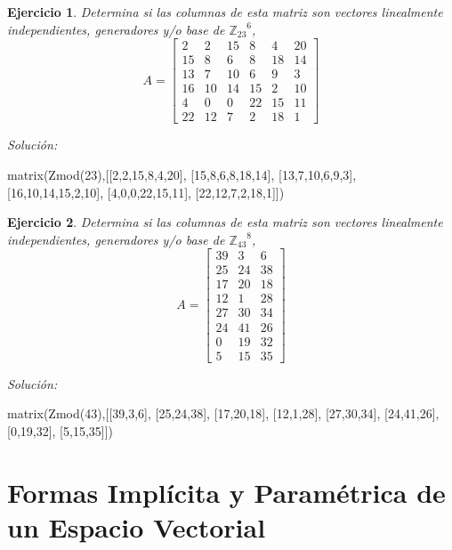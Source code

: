 \documentclass{amsart}
\newtheorem{ejer}{Ejercicio}
\begin{document}


\begin{ejer} Determina si las columnas de esta matriz son vectores linealmente independientes, generadores y/o base de ${{\mathbb Z}_{23}}^{6}$,
\[ A = \left[\begin{array}{rrrrrr}
2 & 2 & 15 & 8 & 4 & 20 \\
15 & 8 & 6 & 8 & 18 & 14 \\
13 & 7 & 10 & 6 & 9 & 3 \\
16 & 10 & 14 & 15 & 2 & 10 \\
4 & 0 & 0 & 22 & 15 & 11 \\
22 & 12 & 7 & 2 & 18 & 1
\end{array}\right] \]
\end{ejer}

{\it Soluci\'on:}

\begin{sageblock}
matrix(Zmod(23),[[2,2,15,8,4,20],
[15,8,6,8,18,14],
[13,7,10,6,9,3],
[16,10,14,15,2,10],
[4,0,0,22,15,11],
[22,12,7,2,18,1]])
\end{sageblock}



\begin{ejer} Determina si las columnas de esta matriz son vectores linealmente independientes, generadores y/o base de ${{\mathbb Z}_{43}}^{8}$,
\[ A = \left[\begin{array}{rrr}
39 & 3 & 6 \\
25 & 24 & 38 \\
17 & 20 & 18 \\
12 & 1 & 28 \\
27 & 30 & 34 \\
24 & 41 & 26 \\
0 & 19 & 32 \\
5 & 15 & 35
\end{array}\right] \]
\end{ejer}

{\it Soluci\'on:}

\begin{sageblock}
matrix(Zmod(43),[[39,3,6],
[25,24,38],
[17,20,18],
[12,1,28],
[27,30,34],
[24,41,26],
[0,19,32],
[5,15,35]])
\end{sageblock}


\section{Formas Implícita y Paramétrica de un Espacio Vectorial}
\end{document}
